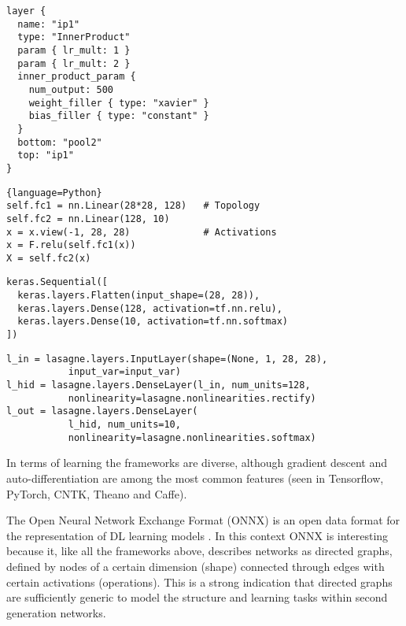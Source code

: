 \documentclass[report.tex]{subfiles}
\begin{document}
\begin{lstlisting}
layer {
  name: "ip1"
  type: "InnerProduct"
  param { lr_mult: 1 }
  param { lr_mult: 2 }
  inner_product_param {
    num_output: 500
    weight_filler { type: "xavier" }
    bias_filler { type: "constant" }
  }
  bottom: "pool2"
  top: "ip1"
}
\end{lstlisting} \label{code:caffe}

\begin{lstlisting}{language=Python}
self.fc1 = nn.Linear(28*28, 128)   # Topology
self.fc2 = nn.Linear(128, 10)
x = x.view(-1, 28, 28)             # Activations
x = F.relu(self.fc1(x))
X = self.fc2(x)
\end{lstlisting} \label{code:pytorch}

\begin{lstlisting}
keras.Sequential([
  keras.layers.Flatten(input_shape=(28, 28)),
  keras.layers.Dense(128, activation=tf.nn.relu),
  keras.layers.Dense(10, activation=tf.nn.softmax)
])
\end{lstlisting} \label{code:keras}

\begin{lstlisting}
l_in = lasagne.layers.InputLayer(shape=(None, 1, 28, 28),
           input_var=input_var)
l_hid = lasagne.layers.DenseLayer(l_in, num_units=128,
           nonlinearity=lasagne.nonlinearities.rectify)
l_out = lasagne.layers.DenseLayer(
           l_hid, num_units=10,
           nonlinearity=lasagne.nonlinearities.softmax)
\end{lstlisting} \label{code:lasagne}

In terms of learning the frameworks are diverse, although gradient descent 
and auto-differentiation are among the most common features 
(seen in Tensorflow, PyTorch, CNTK, Theano and Caffe). 

The Open Neural Network Exchange Format (ONNX) is an open data format for the representation
of \gls{DL} learning models \cite{ONNX2018}. 
In this context ONNX is interesting because it, like all the frameworks above, describes 
networks as directed graphs, defined by nodes of a certain dimension (shape) connected through
edges with certain activations (operations).
This is a strong indication that directed graphs are sufficiently generic to model
the structure and learning tasks within second generation networks.
\end{document}

